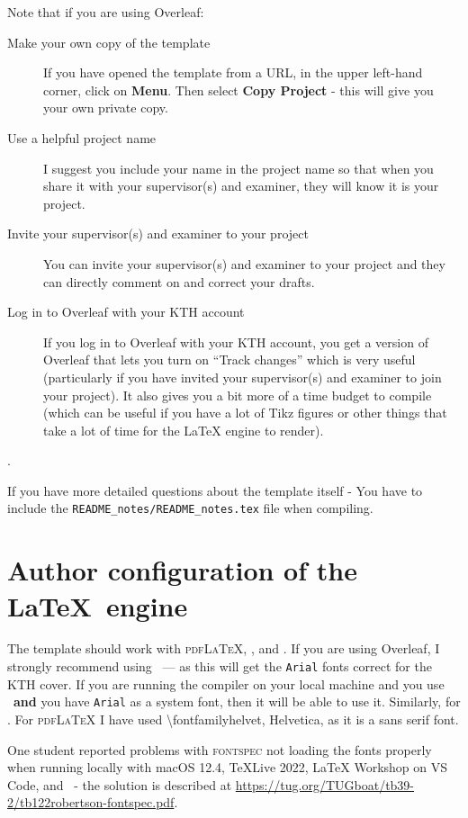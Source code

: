 \documentclass[examplethesis.tex]{subfiles}
\begin{document}
Note that if you are using Overleaf:
\begin{description}
    \item[Make your own copy of the template]
    If you have opened the template from a URL, in the upper left-hand corner, click on \textbf{Menu}. Then select \textbf{Copy Project} - this will give you your own private copy.

\item[Use a helpful project name]
    I suggest you include your name in the project name so that when you share it with your supervisor(s) and examiner, they will know it is your project. 
\item[Invite your supervisor(s) and examiner to your project] 
    You can invite your supervisor(s) and examiner to your project and they can directly comment on and correct your drafts.
\item[Log in to Overleaf with your KTH account] 
If you log in to Overleaf with your KTH account, you get a version of Overleaf that lets you turn on ``Track changes'' which is very useful (particularly if you have invited your supervisor(s) and examiner to join your project). It also gives you a bit more of a time budget to compile (which can be useful if you have a lot of Tikz figures or other things that take a lot of time for the LaTeX engine to render).
\end{description}

.


If you have more detailed questions about the template itself - 
{You have to include the \texttt{README\_notes/README\_notes.tex} file when compiling.}

\section{Author configuration of the \LaTeX\  engine}
\label{sec:latexEngine}
The template should work with \textsc{pdfLaTeX}, \XeLaTeX, and \LuaLaTeX.  If you are using Overleaf, I strongly recommend using \XeLaTeX\ ---  as this will get the \texttt{Arial} fonts correct for the KTH cover. If you are running the compiler on your local machine and you use \XeLaTeX\  \textbf{and} you have \texttt{Arial} as a system font, then it will be able to use it. Similarly, for \LuaLaTeX. For \textsc{pdfLaTeX} I have used \textbackslash fontfamily{helvet}, \ie Helvetica, as it is a sans serif font.

One student reported problems with \textsc{fontspec} not loading the fonts properly when running locally with macOS 12.4, TeXLive 2022, LaTeX Workshop on VS Code, and \XeLaTeX\  - the solution is described at \url{https://tug.org/TUGboat/tb39-2/tb122robertson-fontspec.pdf}.
\end{document}
